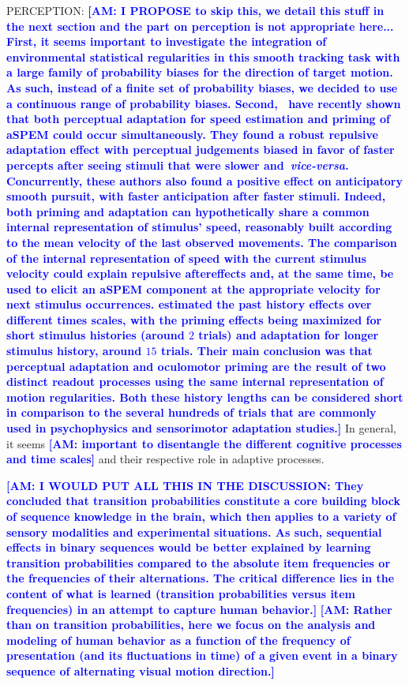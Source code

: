 \documentclass[12pt,english]{article}%
\newcommand{\citet}[1]{\textcite{#1}}
\newcommand{\seeFig}[1]{Figure~\ref{fig:#1}}
\newcommand{\AM}[1]{\textbf{\textcolor{blue}{[AM: #1]}}}
\begin{document}
PERCEPTION:
\AM{I PROPOSE to skip this, we detail this stuff in the next section and the part on perception is not appropriate here... First, it seems important to investigate the integration of environmental statistical regularities
in this smooth tracking task with
a large family of probability biases for the direction of target motion.
As such, instead of a finite set of probability biases, %
we decided to use a continuous range of probability biases.
Second,~\citet{Maus2015} have recently shown that
both perceptual adaptation for speed estimation
and priming of aSPEM could occur simultaneously.
They found a robust repulsive adaptation effect
with perceptual judgements biased in favor of faster percepts
after seeing stimuli that were slower and~\textit{vice-versa}. 
Concurrently, these authors also found
a positive effect on anticipatory smooth pursuit, 
with faster anticipation after faster stimuli.
Indeed, both priming and adaptation can hypothetically share
a common internal representation of stimulus' speed,
reasonably built according to the mean velocity of the last observed movements.
The comparison of the internal representation of speed
with the current stimulus velocity could explain repulsive aftereffects and,
at the same time, be used to elicit
an aSPEM component at the appropriate velocity
for next stimulus occurrences.
\citet{Maus2015} estimated the past history effects over different times scales,
with the priming effects being maximized
for short stimulus histories (around $2$ trials) and
adaptation for longer stimulus history, around $15$ trials.
Their main conclusion was that
perceptual adaptation and oculomotor priming
are the result of two distinct readout processes 
using the same internal representation of motion regularities.
Both these history lengths can be considered
short in comparison to the several hundreds
of trials that are commonly used in psychophysics and sensorimotor adaptation studies.} 
In general, it seems \AM{important to disentangle the different cognitive processes and time scales} 
and their respective role in adaptive processes.


\AM{I WOULD PUT ALL THIS IN THE DISCUSSION: They concluded that transition probabilities constitute
a core building block of sequence knowledge in the brain,
which then applies to a variety of sensory modalities and
experimental situations.
As such, sequential effects in binary sequences would be better explained
by learning transition probabilities
compared to the absolute item frequencies or the frequencies of their alternations.
The critical difference lies in the content
of what is learned (transition probabilities versus item frequencies)
in an attempt to capture human behavior.}
\AM{Rather than on transition probabilities, here we focus on the analysis and modeling of human behavior as a function of the frequency of presentation (and its fluctuations in time) of a given event in a binary sequence of alternating visual motion direction.} 
\end{document}
